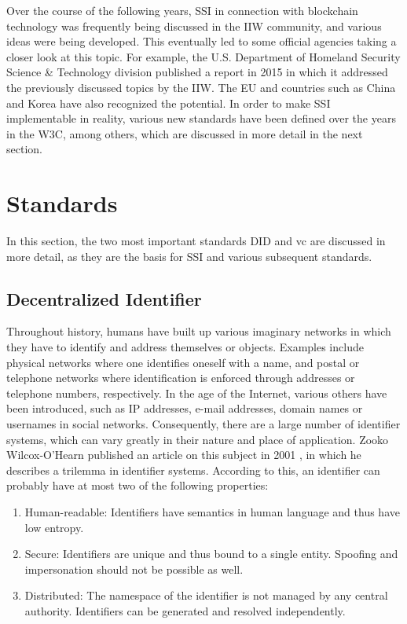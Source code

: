         Over the course of the following years, \ac{SSI} in connection with blockchain technology was frequently  being discussed in the \ac{IIW} community, and various ideas were being developed. This eventually led to some official agencies taking a closer look at this topic. For example, the U.S. Department of Homeland Security Science \& Technology division published a report in 2015 in which it addressed the previously discussed topics by the \ac{IIW}. The EU and countries such as China and Korea have also recognized the potential. In order to make \ac{SSI} implementable in reality, various new standards have been defined over the years in the W3C, among others, which are discussed in more detail in the next section. \cite[p. 6]{preukschat_self-sovereign_2021}
        
   	\section{Standards}\label{section: standards}
	    In this section, the two most important standards \acf{DID} and \acf{vc} are discussed in more detail, as they are the basis for \ac{SSI} and various subsequent standards.
        
	    \subsection{Decentralized Identifier}\label{subsection: did}
	    
	    Throughout history, humans have built up various imaginary networks in which they have to identify and address themselves or objects. Examples include physical networks where one identifies oneself with a name, and postal or telephone networks where identification is enforced through addresses or telephone numbers, respectively. In the age of the Internet, various others have been introduced, such as IP addresses, e-mail addresses, domain names or usernames in social networks. Consequently, there are a large number of identifier systems, which can vary greatly in their nature and place of application. Zooko Wilcox-O'Hearn published an article on this subject in 2001 \cite{wilcox-ohearn_names_2001}, in which he describes a trilemma in identifier systems. According to this, an identifier can probably have at most two of the following properties: \cite[pp. 183-186]{preukschat_self-sovereign_2021}
	    
	    \begin{enumerate}
        	\item Human-readable: Identifiers have semantics in human language and thus have low entropy. 
        	\item Secure: Identifiers are unique and thus bound to a single entity. Spoofing and impersonation should not be possible as well.
        	\item Distributed: The namespace of the identifier is not managed by any central authority. Identifiers can be generated and resolved independently.
        \end{enumerate}
        
